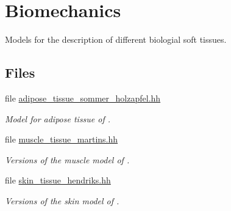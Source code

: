 \hypertarget{group__Biomechanics}{\section{Biomechanics}
\label{group__Biomechanics}
}


Models for the description of different biologial soft tissues.  


\subsection*{Files}
\begin{DoxyCompactItemize}
\item 
file \hyperlink{adipose__tissue__sommer__holzapfel_8hh}{adipose\-\_\-tissue\-\_\-sommer\-\_\-holzapfel.\-hh}
\begin{DoxyCompactList}\small\item\em Model for adipose tissue of \cite{Sommer2013}. \end{DoxyCompactList}\item 
file \hyperlink{muscle__tissue__martins_8hh}{muscle\-\_\-tissue\-\_\-martins.\-hh}
\begin{DoxyCompactList}\small\item\em Versions of the muscle model of \cite{Martins1998}. \end{DoxyCompactList}\item 
file \hyperlink{skin__tissue__hendriks_8hh}{skin\-\_\-tissue\-\_\-hendriks.\-hh}
\begin{DoxyCompactList}\small\item\em Versions of the skin model of \cite{Hendriks2005}. \end{DoxyCompactList}\end{DoxyCompactItemize}
